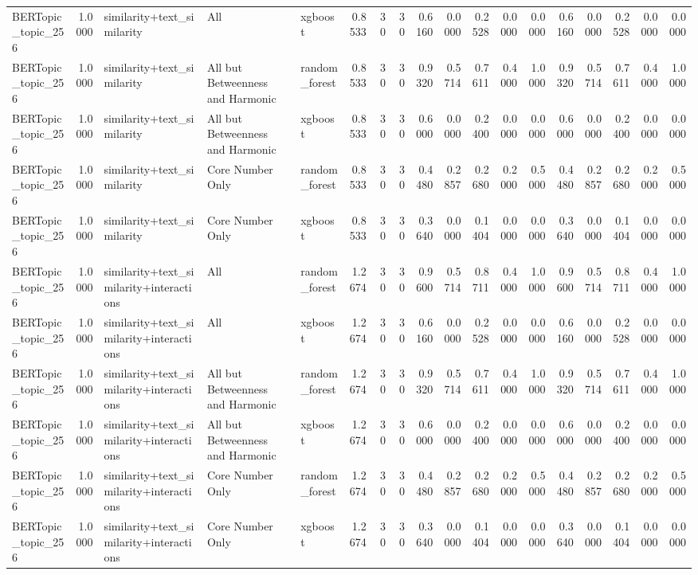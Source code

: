 \begin{tabular}{lrlllrrrrrrrrrrrrr}
BERTopic_topic_256 & 1.0000 & similarity+text_similarity & All & xgboost & 0.8533 & 30 & 30 & 0.6160 & 0.0000 & 0.2528 & 0.0000 & 0.0000 & 0.6160 & 0.0000 & 0.2528 & 0.0000 & 0.0000 \\
BERTopic_topic_256 & 1.0000 & similarity+text_similarity & All but Betweenness and Harmonic & random_forest & 0.8533 & 30 & 30 & 0.9320 & 0.5714 & 0.7611 & 0.4000 & 1.0000 & 0.9320 & 0.5714 & 0.7611 & 0.4000 & 1.0000 \\
BERTopic_topic_256 & 1.0000 & similarity+text_similarity & All but Betweenness and Harmonic & xgboost & 0.8533 & 30 & 30 & 0.6000 & 0.0000 & 0.2400 & 0.0000 & 0.0000 & 0.6000 & 0.0000 & 0.2400 & 0.0000 & 0.0000 \\
BERTopic_topic_256 & 1.0000 & similarity+text_similarity & Core Number Only & random_forest & 0.8533 & 30 & 30 & 0.4480 & 0.2857 & 0.2680 & 0.2000 & 0.5000 & 0.4480 & 0.2857 & 0.2680 & 0.2000 & 0.5000 \\
BERTopic_topic_256 & 1.0000 & similarity+text_similarity & Core Number Only & xgboost & 0.8533 & 30 & 30 & 0.3640 & 0.0000 & 0.1404 & 0.0000 & 0.0000 & 0.3640 & 0.0000 & 0.1404 & 0.0000 & 0.0000 \\
BERTopic_topic_256 & 1.0000 & similarity+text_similarity+interactions & All & random_forest & 1.2674 & 30 & 30 & 0.9600 & 0.5714 & 0.8711 & 0.4000 & 1.0000 & 0.9600 & 0.5714 & 0.8711 & 0.4000 & 1.0000 \\
BERTopic_topic_256 & 1.0000 & similarity+text_similarity+interactions & All & xgboost & 1.2674 & 30 & 30 & 0.6160 & 0.0000 & 0.2528 & 0.0000 & 0.0000 & 0.6160 & 0.0000 & 0.2528 & 0.0000 & 0.0000 \\
BERTopic_topic_256 & 1.0000 & similarity+text_similarity+interactions & All but Betweenness and Harmonic & random_forest & 1.2674 & 30 & 30 & 0.9320 & 0.5714 & 0.7611 & 0.4000 & 1.0000 & 0.9320 & 0.5714 & 0.7611 & 0.4000 & 1.0000 \\
BERTopic_topic_256 & 1.0000 & similarity+text_similarity+interactions & All but Betweenness and Harmonic & xgboost & 1.2674 & 30 & 30 & 0.6000 & 0.0000 & 0.2400 & 0.0000 & 0.0000 & 0.6000 & 0.0000 & 0.2400 & 0.0000 & 0.0000 \\
BERTopic_topic_256 & 1.0000 & similarity+text_similarity+interactions & Core Number Only & random_forest & 1.2674 & 30 & 30 & 0.4480 & 0.2857 & 0.2680 & 0.2000 & 0.5000 & 0.4480 & 0.2857 & 0.2680 & 0.2000 & 0.5000 \\
BERTopic_topic_256 & 1.0000 & similarity+text_similarity+interactions & Core Number Only & xgboost & 1.2674 & 30 & 30 & 0.3640 & 0.0000 & 0.1404 & 0.0000 & 0.0000 & 0.3640 & 0.0000 & 0.1404 & 0.0000 & 0.0000 \\

\end{tabular}
